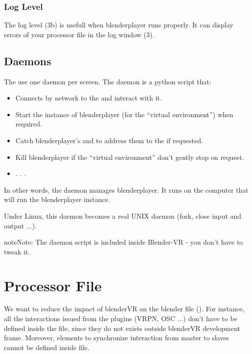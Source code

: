 \documentclass[a4,10pt,openany,oneside]{sphinxmanual}
\begin{document}
\subsubsection{Log Level}
\label{components/user-interface:log-level}
The log level (3b) is usefull when blenderplayer runs properly. It can display errors of your processor file in the log window (3).


\subsection{Daemons}
\label{components/user-interface:daemons}
The  use one daemon per screen. The daemon is a python script that:
\begin{itemize}
\item {} 
Connects by network to the  and interact with it.

\item {} 
Start the instance of blenderplayer (for the ``virtual environment'') when required.

\item {} 
Catch blenderplayer's  and  to address them to the  if requested.

\item {} 
Kill blenderplayer if the ``virtual environment'' don't gently stop on  request.

\item {} 
. . .

\end{itemize}

In other words, the daemon manages blenderplayer. It runs on the computer that will run the blenderplayer instance.

Under Linux, this daemon becomes a real UNIX daemon (fork, close input and output ...).

\begin{notice}{note}{Note:}
The daemon script is included inside Blender-VR - you don't have to tweak it.
\end{notice}


\section{Processor File}
\label{components/processor-file:processor-file}\label{components/processor-file::doc}
We want to reduce the impact of blenderVR on the blender file ().
For instance, all the interactions issued from the plugins (VRPN, OSC ...) don't have to be defined inside the  file, since they do not exists outside blenderVR development frame.
Moreover, elements to synchronize interaction from master to slaves cannot be defined inside  file.
\end{document}
